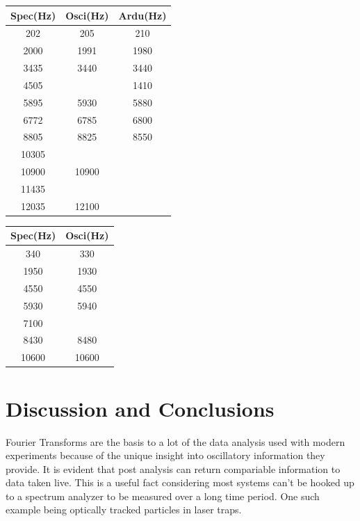 \documentclass[12pt]{article}
\begin{document}
\begin{table}[!ht]
\begin{subtable}{0.45\textwidth}
\centering
{} \label{tab:four_ac} 
	\begin{tabular}{c|c|c}
	Spec(Hz)&Osci(Hz)&Ardu(Hz)\\
	\hline
	202    & 205     & 210    \\
	2000   & 1991    & 1980   \\
	3435   & 3440    & 3440   \\
	4505   &           & 1410   \\
	5895   & 5930    & 5880   \\
	6772   & 6785    & 6800   \\
	8805   & 8825    & 8550   \\
	10305  &           &          \\
	10900  & 10900   &          \\
	11435  &           &          \\
	12035  & 12100   &         
	\end{tabular}
	\bigskip
\end{subtable}
\begin{subtable}{0.45\textwidth}
\centering
{} \label{tab:three_ac} 
	\begin{tabular}[t]{c|c}
	Spec(Hz)&Osci(Hz)\\
	\hline
	340         & 330        \\
	1950        & 1930       \\
	4550        & 4550       \\
	5930        & 5940       \\
	7100        &            \\
	8430        & 8480       \\
	10600       & 10600      \\             
	\end{tabular}
	\bigskip
\end{subtable}
\end{table}



  
\section{Discussion and Conclusions}
	Fourier Transforms are the basis to a lot of the data analysis used with modern experiments because of the unique insight into oscillatory information they provide. It is evident that post analysis can return compariable information to data taken live. This is a useful fact considering most systems can't be hooked up to a spectrum analyzer to be measured over a long time period. One such example being optically tracked particles in laser traps. 
\end{document}
